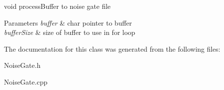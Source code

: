 void process\+Buffer to noise gate file 


\begin{DoxyParams}{Parameters}
{\em buffer} & char pointer to buffer \\
\hline
{\em buffer\+Size} & size of buffer to use in for loop \\
\hline
\end{DoxyParams}


The documentation for this class was generated from the following files\+:\begin{DoxyCompactItemize}
\item 
Noise\+Gate.\+h\item 
Noise\+Gate.\+cpp\end{DoxyCompactItemize}

